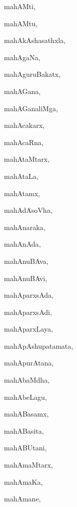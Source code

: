 \begin{multicols}{3}
{\noindent
{mahAMti}, \pageref{mahAMti}

\noindent
{mahAMtu}, \pageref{mahAMtu}

\noindent
{mahAkAshasathxla}, \pageref{mahAkAshasathxla}

\noindent
{mahAgaNa}, \pageref{mahAgaNa}

\noindent
{mahAguruBakatx}, \pageref{mahAguruBakatx}

\noindent
{mahAGana}, \pageref{mahAGana}

\noindent
{mahAGanaliMga}, \pageref{mahAGanaliMga}

\noindent
{mahAcakarx}, \pageref{mahAcakarx}

\noindent
{mahAcaRna}, \pageref{mahAcaRna}

\noindent
{mahAtaMtarx}, \pageref{mahAtaMtarx}

\noindent
{mahAtaLa}, \pageref{mahAtaLa}

\noindent
{mahAtamx}, \pageref{mahAtamx}

\noindent
{mahAdAsoVha}, \pageref{mahAdAsoVha}

\noindent
{mahAnaraka}, \pageref{mahAnaraka}

\noindent
{mahAnAda}, \pageref{mahAnAda}

\noindent
{mahAnuBAva}, \pageref{mahAnuBAva}

\noindent
{mahAnuBAvi}, \pageref{mahAnuBAvi}

\noindent
{mahAparxsAda}, \pageref{mahAparxsAda}

\noindent
{mahAparxsAdi}, \pageref{mahAparxsAdi}

\noindent
{mahAparxLaya}, \pageref{mahAparxLaya}

\noindent
{mahApAshupatamata}, \pageref{mahApAshupatamata}

\noindent
{mahApurAtana}, \pageref{mahApurAtana}

\noindent
{mahAbaMdha}, \pageref{mahAbaMdha}

\noindent
{mahAbeLagu}, \pageref{mahAbeLagu}

\noindent
{mahABasamx}, \pageref{mahABasamx}

\noindent
{mahABasita}, \pageref{mahABasita}

\noindent
{mahABUtani}, \pageref{mahABUtani}

\noindent
{mahAmaMtarx}, \pageref{mahAmaMtarx}

\noindent
{mahAmaKa}, \pageref{mahAmaKa}

\noindent
{mahAmane}, \pageref{mahAmane}

}
\end{multicols}
